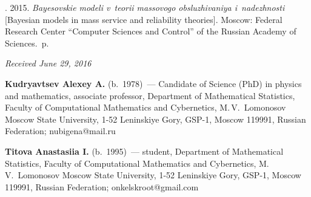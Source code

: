 






  \begin{multicols}{2}

\renewcommand{\bibname}{\protect\rmfamily References}

{\small\frenchspacing
 {%
 \begin{thebibliography}{9}
 
 \vspace*{-2pt}

. 2015. 
\textit{Bayesovskie modeli v~teorii massovogo obsluzhivaniya i~nadezhnosti} 
[Bayesian models in mass service and reliability theories]. Moscow: Federal
Research Center ``Computer Sciences and Control'' of the Russian Academy of Sciences.~p.
\end{thebibliography}

 }
 }

\end{multicols}

\vspace*{-3pt}

\hfill{\small\textit{Received June 29, 2016}}

\Contr

\noindent
\textbf{Kudryavtsev Alexey A.} (b.\ 1978)~--- Candidate of Science (PhD) 
in physics and mathematics, associate professor, Department of Mathematical 
Statistics, Faculty of Computational Mathematics and Cybernetics, M.\,V.~Lomonosov 
Moscow State University, 1-52 Leninskiye Gory, GSP-1, Moscow 119991, 
Russian Federation; %
\mbox{nubigena@mail.ru}

\vspace*{3pt}

\noindent
\textbf{Titova Anastasiia I.} (b.\ 1995)~--- student,
Department of Mathematical 
Statistics, Faculty of Computational Mathematics and Cybernetics, M.\,V.~Lomonosov 
Moscow State University, 1-52 Leninskiye Gory, GSP-1, Moscow 119991, 
Russian Federation; \mbox{onkelskroot@gmail.com}


\label{end\stat}


\renewcommand{\bibname}{\protect\rm Литература} 